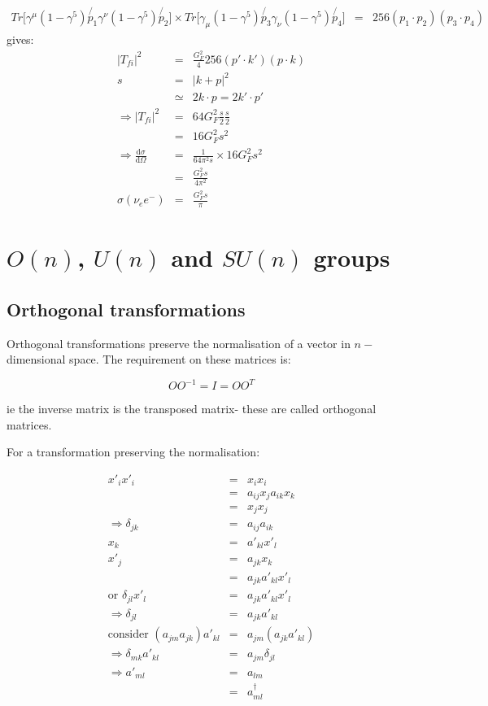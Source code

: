 \begin{eqnarray*}
  Tr\Big[\gamma^{\mu}\left(1 - \gamma^5\right)\not{p_1}\gamma^{\nu}\left(1 - \gamma^5\right)\not{p_2}\Big] \times Tr\Big[\gamma_{\mu}\left(1 - \gamma^5\right)\not{p_3}\gamma_{\nu}\left(1 - \gamma^5\right)\not{p_4}\Big] & = & 256\left(p_1\cdot p_2\right)\left(p_3 \cdot p_4\right)
\end{eqnarray*}
gives:
\begin{eqnarray*}
  |T_{fi}|^2 & = & \frac{G_F^2}{4}256\left(p' \cdot k'\right)(p \cdot k) \\
  s & = & |k + p|^2 \\
  & \simeq & 2k \cdot p = 2 k' \cdot p' \\
  \Rightarrow |T_{fi}|^2 & = & 64 G_F^2 \frac{s}{2}\frac{s}{2} \\
  & = & 16G_F^2 s^2 \\
  \Rightarrow \frac{\mathrm{d}\sigma}{\mathrm{d}\Omega} & = & \frac{1}{64\pi^2 s}\times 16G_F^2s^2 \\
  & = & \frac{G_F^2s}{4\pi^2} \\
  \sigma\left(\nu_e e^-\right) & = & \frac{G_F^2s}{\pi}
\end{eqnarray*}

\section{\texorpdfstring{$O(n)$, $U(n)$ and $SU(n)$}{ONUONSUN} groups}
\subsection{Orthogonal transformations}

Orthogonal transformations preserve the normalisation of a vector in $n-$dimensional space.  The requirement on these matrices is:

\[
  OO^{-1} = I = OO^T
\]

ie the inverse matrix is the transposed matrix- these are called orthogonal matrices.

For a transformation preserving the normalisation:

\begin{eqnarray*}
  x'_i x'_i & = & x_i x_i \\
  & = & a_{ij}x_ja_{ik}x_k \\
  & = & x_j x_j \\
  \Rightarrow \delta_{jk} & = &a_{ij} a_{ik} \\
  x_k & = & a'_{kl}x'_l \\
  x'_j & = & a_{jk}x_k \\
  & = & a_{jk}a'_{kl}x'_l \\
  \textrm{or } \delta_{jl}x'_l & = & a_{jk}a'_{kl}x'_l \\
  \Rightarrow \delta_{jl} & = & a_{jk}a'_{kl} \\
  \textrm{consider } \left(a_{jm}a_{jk}\right)a'_{kl} & = & a_{jm}\left(a_{jk}a'_{kl}\right) \\
  \Rightarrow \delta_{mk}a'_{kl} & = & a_{jm}\delta_{jl} \\
  \Rightarrow a'_{ml} & = & a_{lm} \\
  & = & a^{\dagger}_{ml}
\end{eqnarray*}

